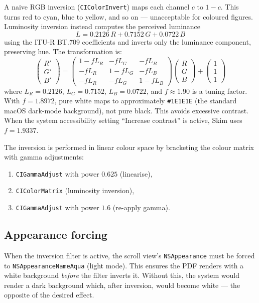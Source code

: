 \documentclass[11pt,a4paper]{article}
\begin{document}
A naive RGB inversion (\texttt{CIColorInvert}) maps each channel $c$ to $1-c$.
This turns red to cyan, blue to yellow, and so on --- unacceptable for coloured
figures. Luminosity inversion instead computes the perceived luminance
\[
    L = 0.2126\,R + 0.7152\,G + 0.0722\,B
\]
using the ITU-R BT.709 coefficients and inverts only the luminance component,
preserving hue. The transformation is:
\[
    \begin{pmatrix} R' \\ G' \\ B' \end{pmatrix}
    =
    \begin{pmatrix}
        1 - f L_R & -f L_G & -f L_B \\
        -f L_R & 1 - f L_G & -f L_B \\
        -f L_R & -f L_G & 1 - f L_B
    \end{pmatrix}
    \begin{pmatrix} R \\ G \\ B \end{pmatrix}
    +
    \begin{pmatrix} 1 \\ 1 \\ 1 \end{pmatrix}
\]
where $L_R = 0.2126$, $L_G = 0.7152$, $L_B = 0.0722$, and $f \approx 1.90$ is
a tuning factor. With $f = 1.8972$, pure white maps to approximately
\texttt{\#1E1E1E} (the standard macOS dark-mode background), not pure black.
This avoids excessive contrast. When the system accessibility setting
``Increase contrast'' is active, Skim uses $f = 1.9337$.

The inversion is performed in linear colour space by bracketing the colour
matrix with gamma adjustments:
\begin{enumerate}
    \item \texttt{CIGammaAdjust} with power $0.625$ (linearise),
    \item \texttt{CIColorMatrix} (luminosity inversion),
    \item \texttt{CIGammaAdjust} with power $1.6$ (re-apply gamma).
\end{enumerate}

\subsection{Appearance forcing}

When the inversion filter is active, the scroll view's
\texttt{NSAppearance} must be forced to \texttt{NSAppearanceNameAqua} (light
mode). This ensures the PDF renders with a white background \emph{before} the
filter inverts it. Without this, the system would render a dark background
which, after inversion, would become white --- the opposite of the desired
effect.
\end{document}
